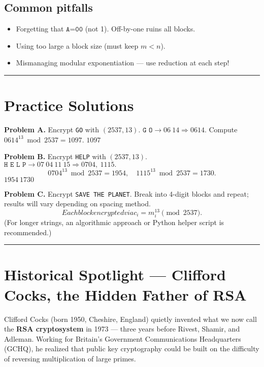 \documentclass[12pt]{article}
\begin{document}
\subsection*{Common pitfalls}
\begin{itemize}[leftmargin=1.25em]
  \item Forgetting that \(\texttt{A=00}\) (not 1). Off-by-one ruins all blocks.
  \item Using too large a block size (must keep \(m < n\)).
  \item Mismanaging modular exponentiation — use reduction at each step!
\end{itemize}

\bigskip
\hrule
\vspace{0.5em}

\section*{Practice Solutions}

\textbf{Problem A.} Encrypt \texttt{GO} with \((2537,13)\).  
\(\texttt{G O} \rightarrow 06\ 14 \Rightarrow 0614.\)  
Compute \(0614^{13} \bmod 2537 = 1097.\)  
\(\boxed{1097}\)

\medskip
\textbf{Problem B.} Encrypt \texttt{HELP} with \((2537,13)\).  
\(\texttt{H E L P} \rightarrow 07\ 04\ 11\ 15 \Rightarrow 0704,\ 1115.\)  
\[
0704^{13} \bmod 2537 = 1954, \quad 1115^{13} \bmod 2537 = 1730.
\]
\(\boxed{1954\ 1730}\)

\medskip
\textbf{Problem C.} Encrypt \texttt{SAVE THE PLANET}.  
Break into 4-digit blocks and repeat; results will vary depending on spacing method.
\[
\boxed{Each block encrypted via } c_i = m_i^{13} \pmod{2537}.
\]
(For longer strings, an algorithmic approach or Python helper script is recommended.)

\bigskip
\hrule
\vspace{0.6em}

\section*{Historical Spotlight — Clifford Cocks, the Hidden Father of RSA}

Clifford Cocks (born 1950, Cheshire, England) quietly invented what we now call the \textbf{RSA cryptosystem} in 1973 — three years before Rivest, Shamir, and Adleman. Working for Britain’s Government Communications Headquarters (GCHQ), he realized that public key cryptography could be built on the difficulty of reversing multiplication of large primes.  
\end{document}
